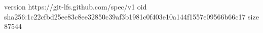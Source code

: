 version https://git-lfs.github.com/spec/v1
oid sha256:1c22cfbd25ee83c8ee32850c39af3b1981c0f403e10a144f1557e09566b66c17
size 87544
